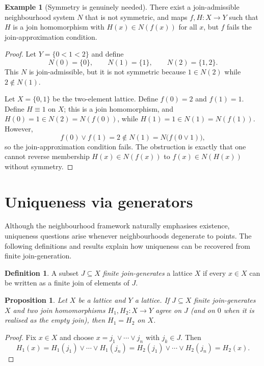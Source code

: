 \documentclass[11pt]{amsart}
\newtheorem{proposition}[theorem]{Proposition}
\theoremstyle{definition}
\newtheorem{definition}[theorem]{Definition}
\newtheorem{example}[theorem]{Example}
\newcommand{\join}{\vee}
\begin{document}
\begin{example}[Symmetry is genuinely needed]\label{ex:symmetry-needed}
There exist a join-admissible neighbourhood system $N$ that is not symmetric, and maps $f,H\colon X\to Y$ such that
$H$ is a join homomorphism with $H(x)\in N(f(x))$ for all $x$, but $f$ fails the join-approximation condition.
\end{example}

\begin{proof}
Let $Y=\{0<1<2\}$ and define
\[
N(0)=\{0\},\qquad N(1)=\{1\},\qquad N(2)=\{1,2\}.
\]
This $N$ is join-admissible, but it is not symmetric because $1\in N(2)$ while $2\notin N(1)$.

Let $X=\{0,1\}$ be the two-element lattice.
Define $f(0)=2$ and $f(1)=1$.
Define $H\equiv 1$ on $X$; this is a join homomorphism, and $H(0)=1\in N(2)=N(f(0))$, while $H(1)=1\in N(1)=N(f(1))$.
However,
\[
f(0)\join f(1)=2\notin N(1)=N\bigl(f(0\join 1)\bigr),
\]
so the join-approximation condition fails.
The obstruction is exactly that one cannot reverse membership $H(x)\in N(f(x))$ to $f(x)\in N(H(x))$ without symmetry.
\end{proof}

\section{Uniqueness via generators}
Although the neighbourhood framework naturally emphasises existence, uniqueness questions
arise whenever neighbourhoods degenerate to points.
The following definitions and results explain how uniqueness can be recovered from finite
join-generation.

\begin{definition}
A subset $J\subseteq X$ \emph{finite join-generates} a lattice $X$ if every $x\in X$ can be written as a finite join of elements of $J$.
\end{definition}

\begin{proposition}\label{prop:uniq}
Let $X$ be a lattice and $Y$ a lattice.
If $J\subseteq X$ finite join-generates $X$ and two join homomorphisms $H_1,H_2\colon X\to Y$ agree on $J$ (and on $0$ when it is realised as the empty join),
then $H_1=H_2$ on $X$.
\end{proposition}

\begin{proof}
Fix $x\in X$ and choose $x=j_1\join\cdots\join j_n$ with $j_k\in J$.
Then
\[
H_1(x)=H_1(j_1)\join\cdots\join H_1(j_n)=H_2(j_1)\join\cdots\join H_2(j_n)=H_2(x).
\]
\end{proof}
\end{document}
